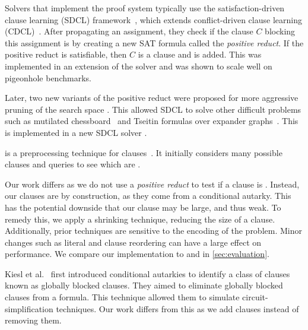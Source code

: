 


Solvers that implement the \pr proof system typically use the
satisfaction-driven clause learning (SDCL) framework~\cite{sdcl}, which extends
conflict-driven clause learning (CDCL)~\cite{sat-handbook}. 
After propagating an assignment, they check if the clause $C$ blocking this
assignment is \pr by creating a new SAT formula called the \emph{positive
reduct}. If the positive reduct is satisfiable, then $C$ is a \pr clause and is
added. This was implemented in an extension of the solver \lingeling and was
shown to scale well on pigeonhole benchmarks.

Later, two new variants of the positive reduct were proposed for more aggressive
pruning of the search space \cite{sadical}. This allowed SDCL to solve other
difficult problems such as mutilated chessboard~\cite{mutilatedchessboard-pr} and
 Tseitin formulas over expander graphs~\cite{hardexamplesresolution}. This
is implemented in a new SDCL solver \sadical.


\prelearn is a preprocessing technique for \pr clauses~\cite{prelearn}. It
initially considers many possible clauses and queries \sadical to see which are
\pr.

Our work differs as we do not use a \emph{positive reduct} to test if a clause
is \pr. Instead, our clauses are \pr by construction, as they come from a
conditional autarky. This has the potential downside that our clause may be
large, and thus weak. To remedy this, we apply a shrinking technique, reducing
the size of a clause. Additionally, prior techniques are sensitive to the
encoding of the problem. Minor changes such as literal and clause reordering can
have a large effect on performance. We compare our
implementation \tool to \sadical and \prelearn in \autoref{sec:evaluation}.

Kiesl et al.~\cite{conditionalautarkies} first introduced conditional autarkies
to identify a class of \pr clauses known as globally blocked clauses. They aimed
to eliminate globally blocked clauses from a formula. This technique allowed
them to simulate circuit-simplification techniques. Our work differs from this
as we add clauses instead of removing them.

